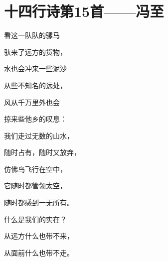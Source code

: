 
\section{十四行诗第15首——冯至}

看这一队队的骡马

驮来了远方的货物，

水也会冲来一些泥沙

从些不知名的远处，

风从千万里外也会

掠来些他乡的叹息：

我们走过无数的山水，

随时占有，随时又放弃，

仿佛鸟飞行在空中，

它随时都管领太空，

随时都感到一无所有。

什么是我们的实在？

从远方什么也带不来，

从面前什么也带不走。